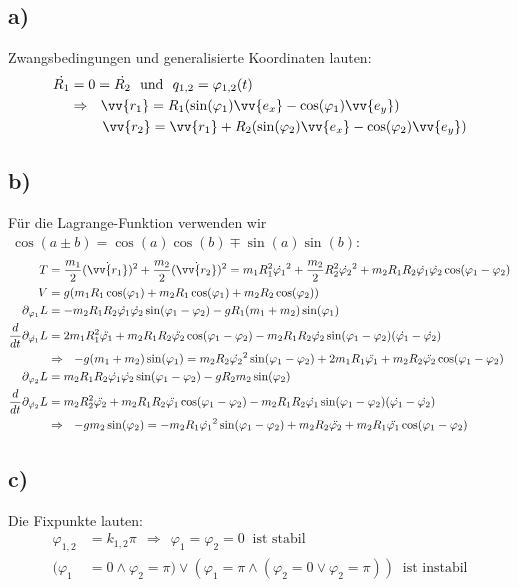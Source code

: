 \documentclass[a4paper,12pt]{article}
\begin{document}
\subsection*{a)} Zwangsbedingungen und generalisierte Koordinaten lauten:
\begin{align*}
\dot{R_1}&=0=\dot{R_2}\ \textrm{ und }\ q_{1,2}=\varphi_{1,2}(t)\\
&\Rightarrow\ \ \vv{r_1}=R_1(\sin(\varphi_1)\vv{e_x}-\cos(\varphi_1)\vv{e_y})\\
&\ \ \ \ \ \ \ \vv{r_2}=\vv{r_1}+R_2(\sin(\varphi_2)\vv{e_x}-\cos(\varphi_2)\vv{e_y})
\end{align*}
\subsection*{b)} Für die Lagrange-Funktion verwenden wir $\ \cos(a\pm b)=\cos(a)\cos(b)\mp \sin(a)\sin(b)$:
\begin{align*}
T&=\frac{m_1}{2}(\dot{\vv{r_1}})^2+\frac{m_2}{2}(\dot{\vv{r_2}})^2 = m_1R_1^2\dot{\varphi_1}^2+\frac{m_2}{2}R_2^2\dot{\varphi_2}^2 +m_2R_1R_2\dot{\varphi_1}\dot{\varphi_2}\cos(\varphi_1-\varphi_2) \\
V&=g(m_1R_1\cos(\varphi_1)+m_2R_1\cos(\varphi_1)+m_2R_2\cos(\varphi_2)) \\
\partial_{\varphi_1}L&=-m_2R_1R_2\dot{\varphi_1}\dot{\varphi_2}\sin(\varphi_1-\varphi_2)-gR_1(m_1+m_2)\sin(\varphi_1)\\
\frac{d}{dt}\partial_{\dot{\varphi_1}}L&=2m_1R_1^2\ddot{\varphi_1}+m_2R_1R_2\ddot{\varphi_2}\cos(\varphi_1-\varphi_2)-m_2R_1R_2\dot{\varphi_2}\sin(\varphi_1-\varphi_2)(\dot{\varphi_1}-\dot{\varphi_2})\\
&\Rightarrow\ \ -g(m_1+m_2)\sin(\varphi_1) = m_2R_2\dot{\varphi_2}^2\sin(\varphi_1-\varphi_2)+2m_1R_1\ddot{\varphi_1}+m_2R_2\ddot{\varphi_2}\cos(\varphi_1-\varphi_2)\\
\partial_{\varphi_2}L&=m_2R_1R_2\dot{\varphi_1}\dot{\varphi_2}\sin(\varphi_1-\varphi_2)-gR_2m_2\sin(\varphi_2)\\
\frac{d}{dt}\partial_{\dot{\varphi_2}}L&=m_2R_2^2\ddot{\varphi_2}+m_2R_1R_2\ddot{\varphi_1}\cos(\varphi_1-\varphi_2)-m_2R_1R_2\dot{\varphi_1}\sin(\varphi_1-\varphi_2)(\dot{\varphi_1}-\dot{\varphi_2})\\
&\Rightarrow\ \ -gm_2\sin(\varphi_2) = -m_2R_1\dot{\varphi_1}^2\sin(\varphi_1-\varphi_2)+m_2R_2\ddot{\varphi_2}+m_2R_1\ddot{\varphi_1}\cos(\varphi_1-\varphi_2)
\end{align*}
\subsection*{c)} Die Fixpunkte lauten:
\begin{align*}
\varphi_{1,2} &= k_{1,2}\pi \ \ \Rightarrow\ \ \varphi_1=\varphi_2=0\ \textrm{ ist stabil} \\
(\varphi_1&=0 \land \varphi_2=\pi) \lor (\varphi_1=\pi \land (\varphi_2 =0 \lor \varphi_2 =\pi))\ \textrm{ ist instabil}
\end{align*}
\end{document}
